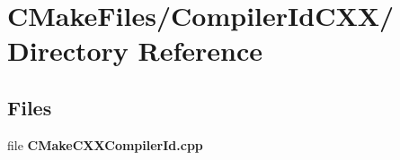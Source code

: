 \section{\-C\-Make\-Files/\-Compiler\-Id\-C\-X\-X/ \-Directory \-Reference}
\label{dir_a210a9cdbab91424db40eb44bef998bd}
\subsection*{\-Files}
\begin{DoxyCompactItemize}
\item 
file {\bf \-C\-Make\-C\-X\-X\-Compiler\-Id.\-cpp}
\end{DoxyCompactItemize}
